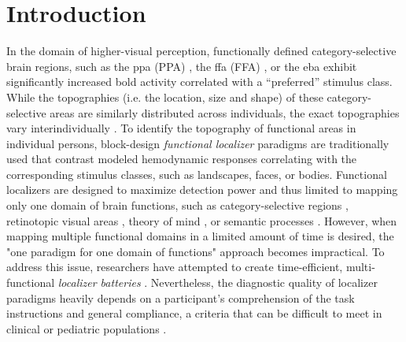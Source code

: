 


\section{Introduction}

In the domain of higher-visual perception, functionally defined
category-selective brain regions, such as the \acl{ppa} (PPA)
\citep{epstein1998ppa}, the \acl{ffa} (FFA) \citep{kanwisher1997ffa},
or the \ac{eba} \citep{downing2001bodyarea} exhibit significantly increased
\acf{bold} activity correlated with a ``preferred'' \citep[][p.
123]{debeck2008interpreting} stimulus class.
%
While the topographies (i.e. the location, size and shape) of these
category-selective areas are similarly distributed across individuals, the exact
topographies vary interindividually \citep{rosenke2021probabilistic,
zhen2017quantifying, zhen2015quantifying, frost2012measuring}.
To identify the topography of functional areas in individual persons,
block-design \textit{functional localizer} paradigms are traditionally used that
contrast modeled hemodynamic responses correlating with the corresponding
stimulus classes, such as landscapes, faces, or bodies.
Functional localizers are designed to maximize detection power and thus limited
to mapping only one domain of brain functions, such as category-selective
regions \citep{stigliani2015temporal}, retinotopic visual areas
\citep{wang2015probabilistic}, theory of mind \citep{spunt2014validating}, or
semantic processes \citep{fedorenko2010new, fernandez2001language}.
However, when mapping multiple functional domains in a limited amount of time is
desired, the "one paradigm for one domain of functions" approach becomes
impractical.
To address this issue, researchers have attempted to create time-efficient,
multi-functional \textit{localizer batteries} \citep[e.g.,][]{barch2013function,
drobyshevsky2006rapid, pinel2007fast}.
Nevertheless, the diagnostic quality of localizer paradigms heavily depends on a
participant's comprehension of the task instructions and general compliance, a
criteria that can be difficult to meet in clinical or pediatric populations
\citep{eickhoff2020towards, vanderwal2019movies}.

